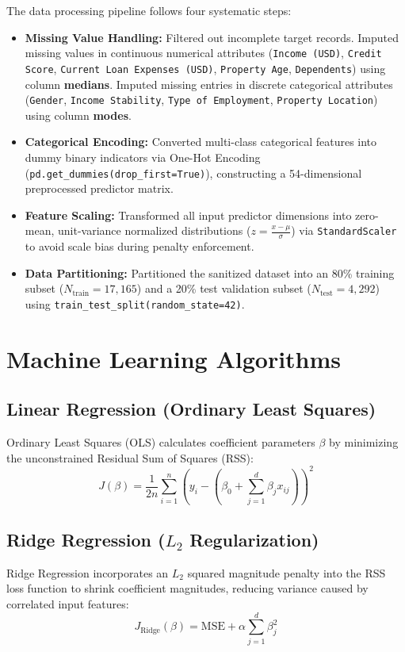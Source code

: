 \documentclass[12pt,a4paper]{article}
\begin{document}
The data processing pipeline follows four systematic steps:
\begin{itemize}[noitemsep]
    \item \textbf{Missing Value Handling:} Filtered out incomplete target records. Imputed missing values in continuous numerical attributes (\texttt{Income (USD)}, \texttt{Credit Score}, \texttt{Current Loan Expenses (USD)}, \texttt{Property Age}, \texttt{Dependents}) using column \textbf{medians}. Imputed missing entries in discrete categorical attributes (\texttt{Gender}, \texttt{Income Stability}, \texttt{Type of Employment}, \texttt{Property Location}) using column \textbf{modes}.
    \item \textbf{Categorical Encoding:} Converted multi-class categorical features into dummy binary indicators via One-Hot Encoding (\texttt{pd.get\_dummies(drop\_first=True)}), constructing a 54-dimensional preprocessed predictor matrix.
    \item \textbf{Feature Scaling:} Transformed all input predictor dimensions into zero-mean, unit-variance normalized distributions ($z = \frac{x - \mu}{\sigma}$) via \texttt{StandardScaler} to avoid scale bias during penalty enforcement.
    \item \textbf{Data Partitioning:} Partitioned the sanitized dataset into an 80\% training subset ($N_{\text{train}} = 17,165$) and a 20\% test validation subset ($N_{\text{test}} = 4,292$) using \texttt{train\_test\_split(random\_state=42)}.
\end{itemize}

\section{Machine Learning Algorithms}

\subsection{Linear Regression (Ordinary Least Squares)}
Ordinary Least Squares (OLS) calculates coefficient parameters $\beta$ by minimizing the unconstrained Residual Sum of Squares (RSS):
\begin{equation}
    J(\beta) = \frac{1}{2n} \sum_{i=1}^{n} \left( y_i - \left( \beta_0 + \sum_{j=1}^{d} \beta_j x_{ij} \right) \right)^2
\end{equation}

\subsection{Ridge Regression ($L_2$ Regularization)}
Ridge Regression incorporates an $L_2$ squared magnitude penalty into the RSS loss function to shrink coefficient magnitudes, reducing variance caused by correlated input features:
\begin{equation}
    J_{\text{Ridge}}(\beta) = \text{MSE} + \alpha \sum_{j=1}^{d} \beta_j^2
\end{equation}
\end{document}
